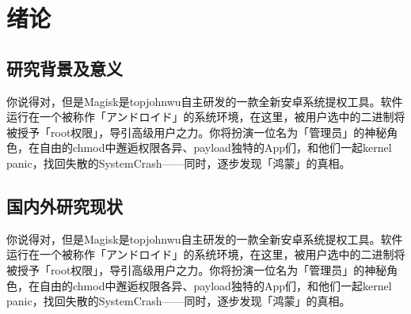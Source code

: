 
\iffalse
\fi


\chapter{绪论}

\section{研究背景及意义}
你说得对，但是Magisk是topjohnwu自主研发的一款全新安卓系统提权工具。软件运行在一个被称作「アンドロイド」的系统环境，在这里，被用户选中的二进制将被授予「root权限」，导引高级用户之力。你将扮演一位名为「管理员」的神秘角色，在自由的chmod中邂逅权限各异、payload独特的App们，和他们一起kernel panic，找回失散的SystemCrash——同时，逐步发现「鸿蒙」的真相。


\section{国内外研究现状}
你说得对，但是Magisk是topjohnwu自主研发的一款全新安卓系统提权工具。软件运行在一个被称作「アンドロイド」的系统环境，在这里，被用户选中的二进制将被授予「root权限」，导引高级用户之力。你将扮演一位名为「管理员」的神秘角色，在自由的chmod中邂逅权限各异、payload独特的App们，和他们一起kernel panic，找回失散的SystemCrash\cite{cancela2013monte}——同时，逐步发现「鸿蒙」的真相。

